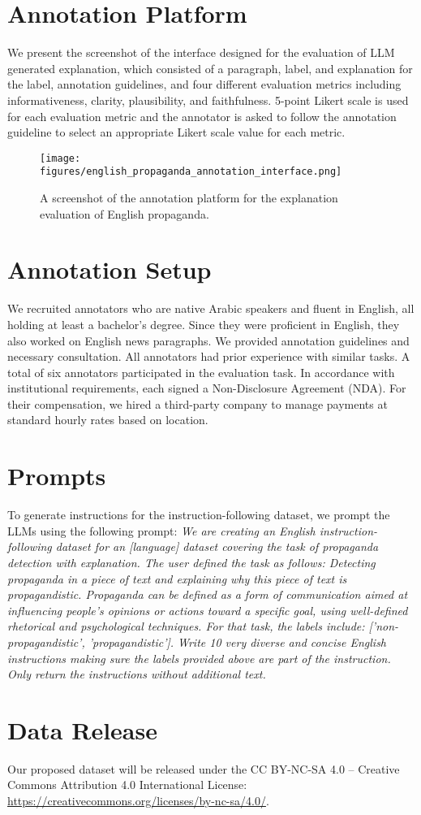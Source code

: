 \section{Annotation Platform}
\label{sec:app_annotation_platform}

We present the screenshot of the interface designed for the evaluation of LLM generated explanation, which consisted
of a paragraph, label, and explanation for the label, annotation guidelines, and four different evaluation metrics including informativeness, clarity, plausibility, and faithfulness. 5-point Likert scale is used for each evaluation metric and the annotator is asked to follow the annotation guideline to select an appropriate Likert scale value for each metric.

\begin{figure*}[]
    \centering
    \texttt{[image: figures/english\_propaganda\_annotation\_interface.png]}
    \caption{A screenshot of the annotation platform for the explanation evaluation of English propaganda.}
    \label{fig:hateful_meme_annotation_interface}
\end{figure*}

\section{Annotation Setup}
\label{sec:app_annotation_setup}
We recruited annotators who are native Arabic speakers and fluent in English, all holding at least a bachelor's degree. Since they were proficient in English, they also worked on English news paragraphs. We provided annotation guidelines and necessary consultation. All annotators had prior experience with similar tasks. A total of six annotators participated in the evaluation task. In accordance with institutional requirements, each signed a Non-Disclosure Agreement (NDA). For their compensation, we hired a third-party company to manage payments at standard hourly rates based on location.



\section{Prompts}
\label{apndix:prompts}
To generate instructions for the instruction-following dataset, we prompt the LLMs using the following prompt: \textit{We are creating an English instruction-following dataset for an [language] dataset covering the task of propaganda detection with explanation. The user defined the task as follows: Detecting propaganda in a piece of text and explaining why this piece of text is propagandistic. Propaganda can be defined as a form of communication aimed at influencing people’s opinions or actions toward a specific goal, using well-defined rhetorical and psychological techniques. For that task, the labels include: ['non-propagandistic', 'propagandistic']. Write 10 very diverse and concise English instructions making sure the labels provided above are part of the instruction. Only return the instructions without additional text.}



\section{Data Release}
\label{apndix:release}
Our proposed dataset %
will be released under the CC BY-NC-SA 4.0 -- Creative Commons Attribution 4.0 International License: \url{https://creativecommons.org/licenses/by-nc-sa/4.0/}.
